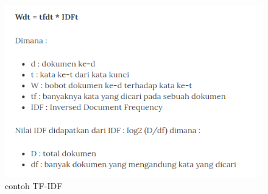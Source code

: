 \begin{enumerate}
\begin{figure}[ht]
\centering
\includegraphics[scale=0.2]{figures/1174042/chapter4/1,6.PNG}
\caption{contoh TF-IDF}
\label{contoh}
\end{figure}

\end{enumerate}


